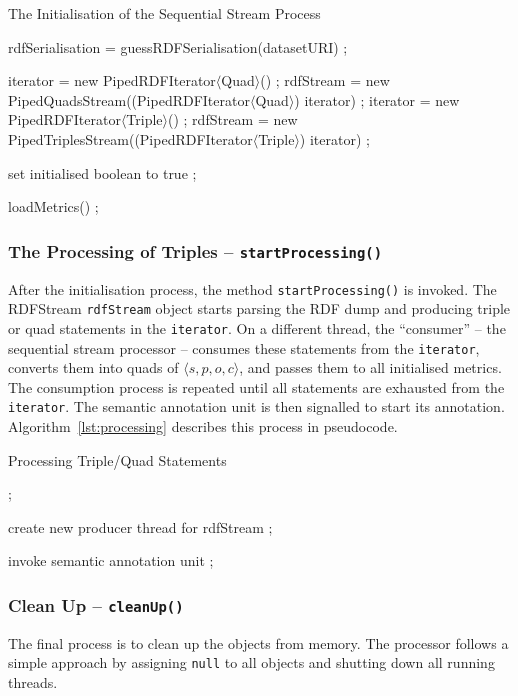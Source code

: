 \begin{algorithm}
\caption{The Initialisation of the Sequential Stream Process}
\label{lst:setUp}
\begin{algorithmic}[1]
\State rdfSerialisation = guessRDFSerialisation(datasetURI) ;

\State iterator = new PipedRDFIterator$\langle$Quad$\rangle$() ;
\State rdfStream = new PipedQuadsStream((PipedRDFIterator$\langle$Quad$\rangle$) iterator) ;
\EndIf
{} 
\State iterator = new PipedRDFIterator$\langle$Triple$\rangle$() ;
\State rdfStream = new PipedTriplesStream((PipedRDFIterator$\langle$Triple$\rangle$) iterator) ;
\EndIf

\State set initialised boolean to true ;

\State loadMetrics() ;
\EndProcedure
\end{algorithmic}
\end{algorithm}

\subsubsection{The Processing of Triples – \texttt{startProcessing()}}
After the initialisation process, the method \texttt{startProcessing()} is invoked.
The RDFStream \texttt{rdfStream} object starts parsing the RDF dump and producing triple or quad statements in the \texttt{iterator}.
On a different thread, the ``consumer'' – the sequential stream processor – consumes these statements from the \texttt{iterator}, converts them into quads of $\langle s,p,o,c \rangle$, and passes them to all initialised metrics.
The consumption process is repeated until all statements are exhausted from the \texttt{iterator}.
The semantic annotation unit is then signalled to start its annotation.
Algorithm~\ref{lst:processing} describes this process in pseudocode.

\begin{algorithm}
\caption{Processing Triple/Quad Statements}
\label{lst:processing}
\begin{algorithmic}[1]
  ; \EndIf

\State create new producer thread for rdfStream ;

\EndWhile

\State invoke semantic annotation unit ;
\EndProcedure
\end{algorithmic}
\end{algorithm}

\subsubsection{Clean Up – \texttt{cleanUp()}}
The final process is to clean up the objects from memory.
The processor follows a simple approach by assigning \texttt{null} to all objects and shutting down all running threads.

